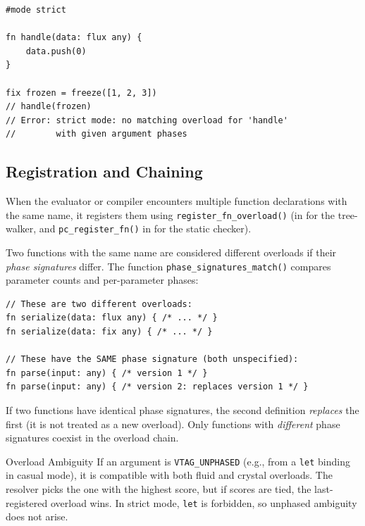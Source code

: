 \begin{lstlisting}[language=Lattice, caption={Compile-time overload checking}]
#mode strict

fn handle(data: flux any) {
    data.push(0)
}

fix frozen = freeze([1, 2, 3])
// handle(frozen)
// Error: strict mode: no matching overload for 'handle'
//        with given argument phases
\end{lstlisting}

\subsection{Registration and Chaining}

When the evaluator or compiler encounters multiple function declarations with the same name, it registers them using \lstinline|register_fn_overload()| (in  for the tree-walker, and \lstinline|pc_register_fn()| in  for the static checker).

Two functions with the same name are considered different overloads if their \emph{phase signatures} differ.
The function \lstinline|phase_signatures_match()| compares parameter counts and per-parameter phases:

\begin{lstlisting}[language=Lattice, caption={Different phase signatures create overloads}]
// These are two different overloads:
fn serialize(data: flux any) { /* ... */ }
fn serialize(data: fix any) { /* ... */ }

// These have the SAME phase signature (both unspecified):
fn parse(input: any) { /* version 1 */ }
fn parse(input: any) { /* version 2: replaces version 1 */ }
\end{lstlisting}

If two functions have identical phase signatures, the second definition \emph{replaces} the first (it is not treated as a new overload).
Only functions with \emph{different} phase signatures coexist in the overload chain.

\begin{warnbox}{Overload Ambiguity}
If an argument is \lstinline|VTAG_UNPHASED| (e.g., from a \lstinline|let| binding in casual mode), it is compatible with both fluid and crystal overloads.
The resolver picks the one with the highest score, but if scores are tied, the last-registered overload wins.
In strict mode, \lstinline|let| is forbidden, so unphased ambiguity does not arise.
\end{warnbox}


